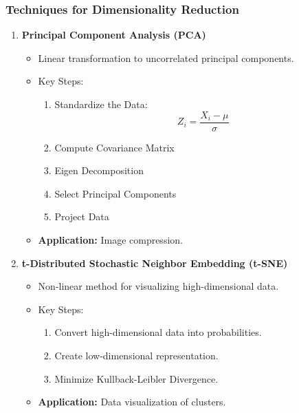\documentclass[aspectratio=169]{beamer}
\begin{document}
\begin{frame}[fragile]
    \frametitle{Techniques for Dimensionality Reduction}
    \begin{enumerate}
        \item \textbf{Principal Component Analysis (PCA)}
            \begin{itemize}
                \item Linear transformation to uncorrelated principal components.
                \item Key Steps:
                    \begin{enumerate}
                        \item Standardize the Data:
                            \[
                            Z_i = \frac{X_i - \mu}{\sigma}
                            \]
                        \item Compute Covariance Matrix
                        \item Eigen Decomposition
                        \item Select Principal Components
                        \item Project Data
                    \end{enumerate}
                \item \textbf{Application:} Image compression.
            \end{itemize}
        \item \textbf{t-Distributed Stochastic Neighbor Embedding (t-SNE)}
            \begin{itemize}
                \item Non-linear method for visualizing high-dimensional data.
                \item Key Steps:
                    \begin{enumerate}
                        \item Convert high-dimensional data into probabilities.
                        \item Create low-dimensional representation.
                        \item Minimize Kullback-Leibler Divergence.
                    \end{enumerate}
                \item \textbf{Application:} Data visualization of clusters.
            \end{itemize}
    \end{enumerate}
\end{frame}
\end{document}
